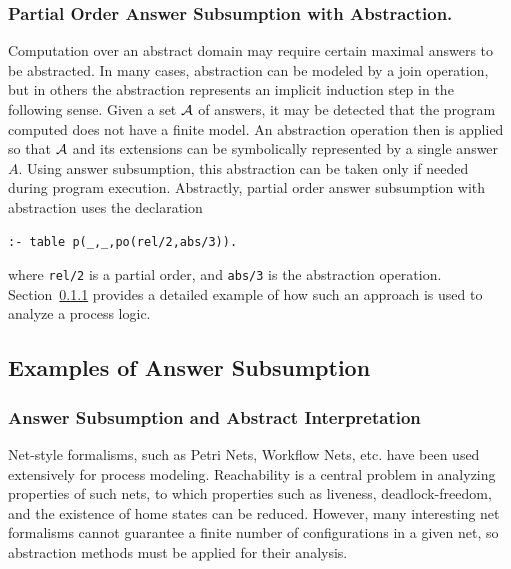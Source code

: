 \subsubsection{Partial Order Answer Subsumption with Abstraction.}
Computation over an abstract domain may require certain maximal
answers to be abstracted.  In many cases, abstraction can be modeled
by a join operation, but in others the abstraction represents an
implicit induction step in the following sense. Given a set ${\cal A}$ of
answers, it may be detected that the program computed does not have a
finite model.  An abstraction operation then is applied so that ${\cal A}$
and its extensions can be symbolically represented by a single answer
$A$.  Using answer subsumption, this abstraction can be taken only if
needed during program execution.  Abstractly, partial order answer
subsumption with abstraction uses the declaration {\small
\begin{verbatim}
:- table p(_,_,po(rel/2,abs/3)).
\end{verbatim}
} 
%
\noindent
where {\tt rel/2} is a partial order, and {\tt abs/3} is the
abstraction operation.  Section~\ref{sec:abs-int} provides a detailed
example of how such an approach is used to analyze a process logic.

\subsection{Examples of Answer Subsumption} \label{sec:answer-subsumption-examples}

\subsubsection{Answer Subsumption and Abstract Interpretation} \label{sec:abs-int}
%
Net-style formalisms, such as Petri Nets, Workflow Nets, etc. have
been used extensively for process modeling.  Reachability is a central
problem in analyzing properties of such nets, to which properties such
as liveness, deadlock-freedom, and the existence of home states can be
reduced.  However, many interesting net formalisms cannot guarantee a
finite number of configurations in a given net, so abstraction methods
must be applied for their analysis.

